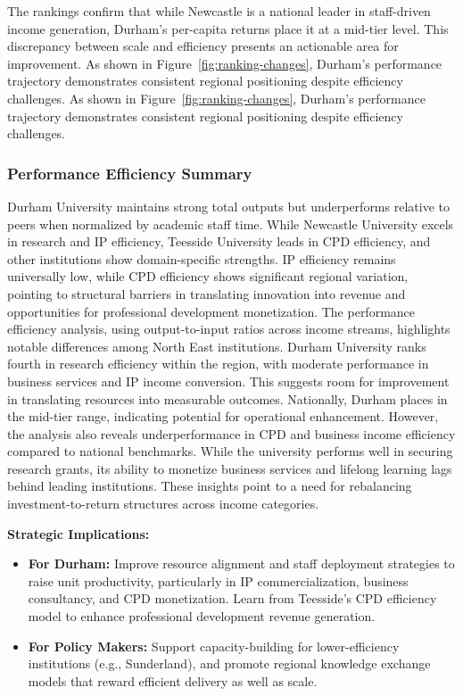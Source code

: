 \documentclass[journal,onecolumn, 10pt,draftclsnofoot]{IEEEtran}
\begin{document}
The rankings confirm that while Newcastle is a national leader in staff-driven income generation, Durham's per-capita returns place it at a mid-tier level. This discrepancy between scale and efficiency presents an actionable area for improvement. As shown in Figure~\ref{fig:ranking-changes}, Durham's performance trajectory demonstrates consistent regional positioning despite efficiency challenges. As shown in Figure~\ref{fig:ranking-changes}, Durham's performance trajectory demonstrates consistent regional positioning despite efficiency challenges.

\subsubsection{Performance Efficiency Summary}

Durham University maintains strong total outputs but underperforms relative to peers when normalized by academic staff time. While Newcastle University excels in research and IP efficiency, Teesside University leads in CPD efficiency, and other institutions show domain-specific strengths. IP efficiency remains universally low, while CPD efficiency shows significant regional variation, pointing to structural barriers in translating innovation into revenue and opportunities for professional development monetization. The performance efficiency analysis, using output-to-input ratios across income streams, highlights notable differences among North East institutions. Durham University ranks fourth in research efficiency within the region, with moderate performance in business services and IP income conversion. This suggests room for improvement in translating resources into measurable outcomes. Nationally, Durham places in the mid-tier range, indicating potential for operational enhancement. However, the analysis also reveals underperformance in CPD and business income efficiency compared to national benchmarks. While the university performs well in securing research grants, its ability to monetize business services and lifelong learning lags behind leading institutions. These insights point to a need for rebalancing investment-to-return structures across income categories.

\textbf{Strategic Implications:}
\begin{itemize}
    \item \textbf{For Durham:} Improve resource alignment and staff deployment strategies to raise unit productivity, particularly in IP commercialization, business consultancy, and CPD monetization. Learn from Teesside's CPD efficiency model to enhance professional development revenue generation.
    
    \item \textbf{For Policy Makers:} Support capacity-building for lower-efficiency institutions (e.g., Sunderland), and promote regional knowledge exchange models that reward efficient delivery as well as scale.
\end{itemize}
\end{document}
